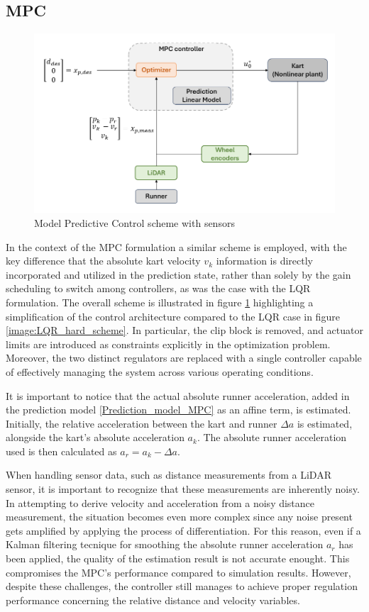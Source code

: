 \documentclass[a4paper,12pt,oneside]{book}
\begin{document}
\subsection*{MPC}
\begin{figure}[h!]
	\centering
	\includegraphics[width=1.0\textwidth]{MPC_hard_scheme.png}
	\caption{Model Predictive Control scheme with sensors}
	\label{image:MPC_hard_scheme}
\end{figure}

In the context of the MPC formulation a similar scheme is employed, with the key difference that the absolute kart velocity $v_k$ information is directly incorporated and utilized in the prediction state, rather than solely by the gain scheduling to switch among controllers, as was the case with the LQR formulation.
The overall scheme is illustrated in figure \ref{image:MPC_hard_scheme} highlighting a simplification of the control architecture compared to the LQR case in figure \ref{image:LQR_hard_scheme}.
In particular, the clip block is removed, and actuator limits are introduced as constraints explicitly in the optimization problem.
Moreover, the two distinct regulators are replaced with a single controller capable of effectively managing the system across various operating conditions.

\bigskip
It is important to notice that the actual absolute runner acceleration, added in the prediction model  \eqref{Prediction_model_MPC} as an affine term, is estimated. 
Initially, the relative acceleration between the kart and runner $\Delta a$ is estimated, alongside the kart's absolute acceleration $a_k$.
The absolute runner acceleration used is then calculated as $a_r = a_k - \Delta a$.

\bigskip
When handling sensor data, such as distance measurements from a LiDAR sensor, it is important to recognize that these measurements are inherently noisy.
In attempting to derive velocity and acceleration from a noisy distance measurement, the situation becomes even more complex since any noise present gets amplified by applying the process of differentiation.
For this reason, even if a Kalman filtering tecnique for smoothing the absolute runner acceleration $a_r$ has been applied, the quality of the estimation result is not accurate enought.
This compromises the MPC's performance compared to simulation results. 
However, despite these challenges, the controller still manages to achieve proper regulation performance concerning the relative distance and velocity variables.
\end{document}
